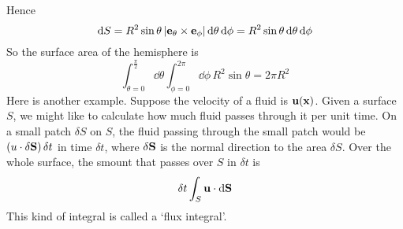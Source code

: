 Hence
\[
	\dd{S} = R^2 \sin\theta\, \abs{\vb e_\theta \times \vb e_\phi} \dd{\theta}\dd{\phi} = R^2 \sin \theta \dd{\theta} \dd{\phi}
\]
So the surface area of the hemisphere is
\[
	\int_{\theta = 0}^{\frac{\pi}{2}} \dd{\theta} \int_{\phi = 0}^{2 \pi} \dd{\phi} \, R^2 \sin \theta = 2 \pi R^2
\]
Here is another example.
Suppose the velocity of a fluid is \(\vb u(\vb x)\).
Given a surface \(S\), we might like to calculate how much fluid passes through it per unit time.
On a small patch \(\delta S\) on \(S\), the fluid passing through the small patch would be \((u \cdot \delta \vb S)\,\delta t\) in time \(\delta t\), where \(\delta \vb S\) is the normal direction to the area \(\delta S\).
Over the whole surface, the smount that passes over \(S\) in \(\delta t\) is
\[
	\delta t \int_S \vb u \cdot \dd \vb S
\]
This kind of integral is called a `flux integral'.

